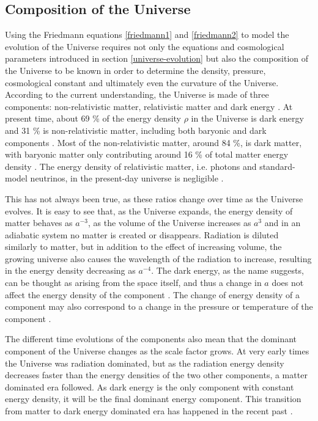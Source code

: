 \documentclass[english, twoside]{HYgradu}
\begin{document}
\subsection{Composition of the Universe} \label{universe-composition}
Using the Friedmann equations \ref{friedmann1} and \ref{friedmann2} to model the evolution of the Universe requires not only the equations and cosmological parameters introduced in section \ref{universe-evolution} but also the composition of the Universe to be known in order to determine the density, pressure, cosmological constant and ultimately even the curvature of the Universe. According to the current understanding, the Universe is made of three components: non-relativistic matter, relativistic matter and dark energy \citep{mo2010galaxy}. At present time, about 69 \% of the energy density $\rho$ in the Universe is dark energy and 31 \% is non-relativistic matter, including both baryonic and dark components \citep{planck2016resultsI}. Most of the non-relativistic matter, around 84 \%, is dark matter, with baryonic matter only contributing around 16 \% of total matter energy density \citep{planck2016resultsI}. The energy density of relativistic matter, i.e. photons and standard-model neutrinos, in the present-day universe is negligible \citep{mo2010galaxy}.

This has not always been true, as these ratios change over time as the Universe evolves. It is easy to see that, as the Universe expands, the energy density of matter behaves as $a^{-3}$, as the volume of the Universe increases as $a^3$ and in an adiabatic system no matter is created or disappears. Radiation is diluted similarly to matter, but in addition to the effect of increasing volume, the growing universe also causes the wavelength of the radiation to increase, resulting in the energy density decreasing as $a^{-4}$. The dark energy, as the name suggests, can be thought as arising from the space itself, and thus a change in $a$ does not affect the energy density of the component \citep{mo2010galaxy}. The change of energy density of a component may also correspond to a change in the pressure or temperature of the component \citep{mo2010galaxy}.

The different time evolutions of the components also mean that the dominant component of the Universe changes as the scale factor grows. At very early times the Universe was radiation dominated, but as the radiation energy density decreases faster than the energy densities of the two other components, a matter dominated era followed. As dark energy is the only component with constant energy density, it will be the final dominant energy component. This transition from matter to dark energy dominated era has happened in the recent past \citep{mo2010galaxy}.
\end{document}
